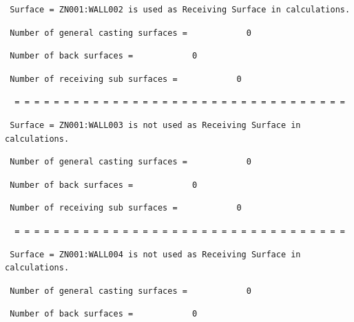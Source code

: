 \begin{lstlisting}
 Surface = ZN001:WALL002 is used as Receiving Surface in calculations.
\end{lstlisting}

\begin{lstlisting}
 Number of general casting surfaces =            0
\end{lstlisting}

\begin{lstlisting}
 Number of back surfaces =            0
\end{lstlisting}

\begin{lstlisting}
 Number of receiving sub surfaces =            0
\end{lstlisting}

\begin{lstlisting}
  = = = = = = = = = = = = = = = = = = = = = = = = = = = = = = = = = =
\end{lstlisting}

\begin{lstlisting}
 Surface = ZN001:WALL003 is not used as Receiving Surface in calculations.
\end{lstlisting}

\begin{lstlisting}
 Number of general casting surfaces =            0
\end{lstlisting}

\begin{lstlisting}
 Number of back surfaces =            0
\end{lstlisting}

\begin{lstlisting}
 Number of receiving sub surfaces =            0
\end{lstlisting}

\begin{lstlisting}
  = = = = = = = = = = = = = = = = = = = = = = = = = = = = = = = = = =
\end{lstlisting}

\begin{lstlisting}
 Surface = ZN001:WALL004 is not used as Receiving Surface in calculations.
\end{lstlisting}

\begin{lstlisting}
 Number of general casting surfaces =            0
\end{lstlisting}

\begin{lstlisting}
 Number of back surfaces =            0
\end{lstlisting}

